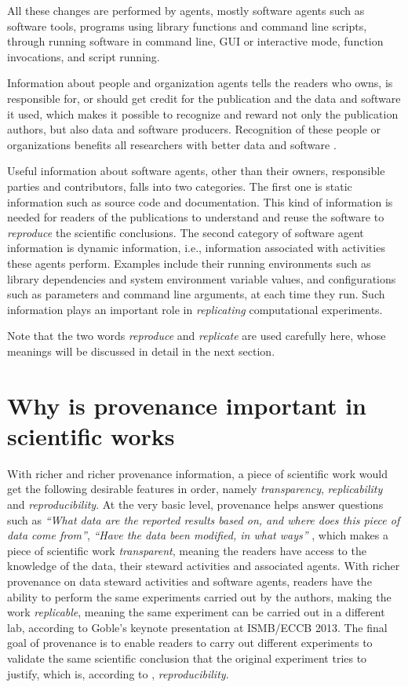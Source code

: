 All these changes are performed by agents, mostly software agents such as software tools, programs using library functions and command line scripts, through running software in command line, GUI or interactive mode, function invocations, and script running.

Information about people and organization agents tells the readers who owns, is responsible for, or should get credit for the publication and the data and software it used, which makes it possible to recognize and reward not only the publication authors, but also data and software producers. Recognition of these people or organizations benefits all researchers with better data and software \cite{parsons2010data, goble2014better}. 

Useful information about software agents, other than their owners, responsible parties and contributors, falls into two categories. The first one is static information such as source code and documentation. This kind of information is needed for readers of the publications to understand and reuse the software to \emph{reproduce} the scientific conclusions. The second category of software agent information is dynamic information, i.e., information associated with activities these agents perform. Examples include their running environments such as library dependencies and system environment variable values, and configurations such as parameters and command line arguments, at each time they run. Such information plays an important role in \emph{replicating} computational experiments.

Note that the two words \emph{reproduce} and \emph{replicate} are used carefully here, whose meanings will be discussed in detail in the next section.


\section{Why is provenance important in scientific works}
With richer and richer provenance information, a piece of scientific work would get the following desirable features in order, namely \emph{transparency}, \emph{replicability} and \emph{reproducibility}. At the very basic level, provenance helps answer questions such as \emph{``What data are the reported results based on, and where does this piece of data come from''}, \emph{``Have the data been modified, in what ways''} \cite{davidson2008provenance}, which makes a piece of scientific work \emph{transparent}, meaning the readers have access to the knowledge of the data, their steward activities and associated agents. With richer provenance on data steward activities and software agents, readers have the ability to perform the same experiments carried out by the authors, making the work \emph{replicable}, meaning the same experiment can be carried out in a different lab, according to Goble's keynote presentation at ISMB/ECCB 2013. The final goal of provenance is to enable readers to carry out different experiments to validate the same scientific conclusion that the original experiment tries to justify, which is, according to \cite{drummond2009replicability}, \emph{reproducibility}.


